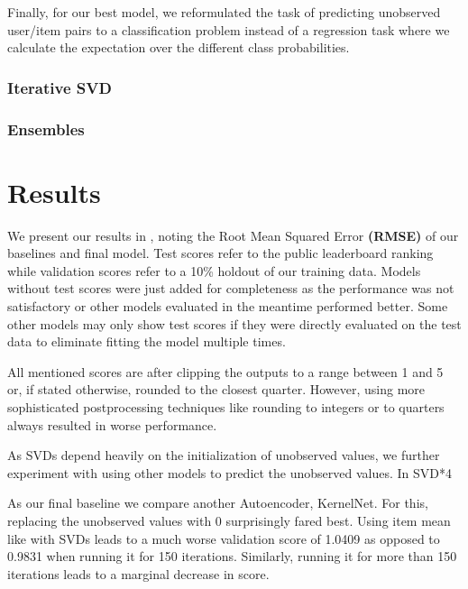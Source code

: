 \documentclass[10pt,conference,compsocconf]{IEEEtran}
\begin{document}
    Finally, for our best model, we reformulated the task of predicting unobserved user/item pairs to a classification problem instead of a regression task where we calculate the expectation over the different class probabilities.

    \subsubsection{Iterative SVD}

    \subsubsection{Ensembles}


    \section{Results}
    We present our results in , noting the Root Mean Squared Error \textbf{(RMSE)} of our baselines and final model.
    Test scores refer to the public leaderboard ranking while validation scores refer to a 10\% holdout of our training data.
    Models without test scores were just added for completeness as the performance was not satisfactory or other models evaluated in the meantime performed better.
    Some other models may only show test scores if they were directly evaluated on the test data to eliminate
    fitting the model multiple times.

    All mentioned scores are after clipping the outputs to a range between 1 and 5 or, if stated otherwise, rounded to the closest quarter.
    However, using more sophisticated postprocessing techniques like rounding to integers or to quarters always resulted in worse performance.


    As SVDs depend heavily on the initialization of unobserved values, we further experiment with using other models to predict the unobserved values.
    In  SVD*4



    As our final baseline we compare another Autoencoder, KernelNet.
    For this, replacing the unobserved values with 0 surprisingly fared best.
    Using item mean like with SVDs leads to a much worse validation score of 1.0409 as opposed to 0.9831 when running it for 150 iterations.
    Similarly, running it for more than 150 iterations leads to a marginal decrease in score.
\end{document}
